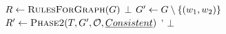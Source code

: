 \begin{algorithmic}[1]

\Function{\phasetwo}{\test, \gr, \impl, \consist}    \label{fig:rules:phase2}
    \State $\ruleset \gets \Call{\rulesforgraph}{\gr}$
      \label{fig:rules:phase2sufficient}
        \State \Return $\bot$
    \EndIf
        \label{fig:rules:phase2loop}
        \State $G' \gets G \setminus \{(w_1, w_2)\}$  \label{fig:rules:phase2remove}
        \State $\ruleset' \gets \Call{\phasetwo}{\test, \gr', \impl, \consist}$ \label{fig:rules:phase2recurse}
            \State \Return {}'
        \EndIf
    \EndFor
        \State \Return {} {}
    \Else
        \State \Return $\bot$
    \EndIf
\EndFunction

\end{algorithmic}
